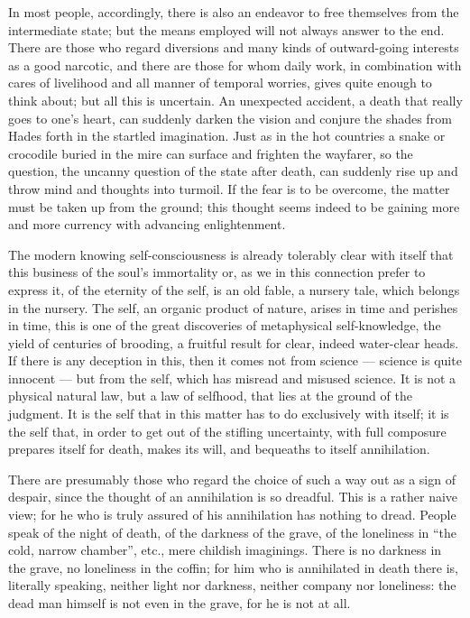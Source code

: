 \documentclass[12pt,a4paper,openany]{book}
\newcommand{\opage}[1]{\marginnote{\footnotesize\textit{[#1]}}}
\begin{document}
In most people, accordingly, there is also an endeavor
to free themselves from the intermediate state; but the means
employed will not always answer to the end. There are
those who regard diversions and many kinds of outward-going
interests as a good narcotic, and there are those
for whom daily work, in combination with cares of livelihood
and all manner of temporal worries, gives quite enough to think
about; but all this is uncertain. An unexpected accident, a
death that really goes to one's heart, can suddenly darken
the vision and conjure the shades from Hades forth in the startled
imagination. Just as in the hot countries a snake or crocodile buried in the mire
can surface and frighten
the wayfarer, so the question, the uncanny
question of the state after death, can suddenly rise up
and throw mind and thoughts into turmoil. If the fear is to be overcome,
the matter must be taken up from the ground; this thought
seems indeed to be gaining more and more currency with advancing
enlightenment.

The modern knowing self-consciousness is already
tolerably clear with itself that this business of
the soul's immortality or, as we in this connection
prefer to express it, of the eternity of the self, is an old
fable, a nursery tale, which belongs in the nursery.
The self, an organic product of nature, arises in time and
perishes in time, this is one of the great discoveries
of metaphysical self-knowledge, the yield of centuries of
brooding, a fruitful result for clear, indeed
water-clear heads. If there is any deception in this, then it comes
\setcounter{footnote}{0}%
\opage{199}not from science --- science is quite
innocent --- but from the self, which has misread and misused
science. It is not a physical natural law, but a
law of selfhood, that lies at the ground of the judgment. It is
the self that in this matter has to do exclusively with itself;
it is the self that, in order to get out of the stifling
uncertainty, with full composure prepares itself for death,
makes its will, and bequeaths to itself annihilation.

There are presumably those who regard the choice of such a way out
as a sign of despair, since the thought of an annihilation
is so dreadful. This is a rather naive view;
for he who is truly assured of his annihilation
has nothing to dread. People speak of the night of
death, of the darkness of the grave, of the loneliness in ``the cold,
narrow chamber'', etc., mere childish imaginings.
There is no darkness in the grave, no loneliness in the coffin;
for him who is annihilated in death there is, literally speaking,
neither light nor darkness, neither company nor loneliness:
the dead man himself is not even in the grave, for he
is not at all.
\end{document}
